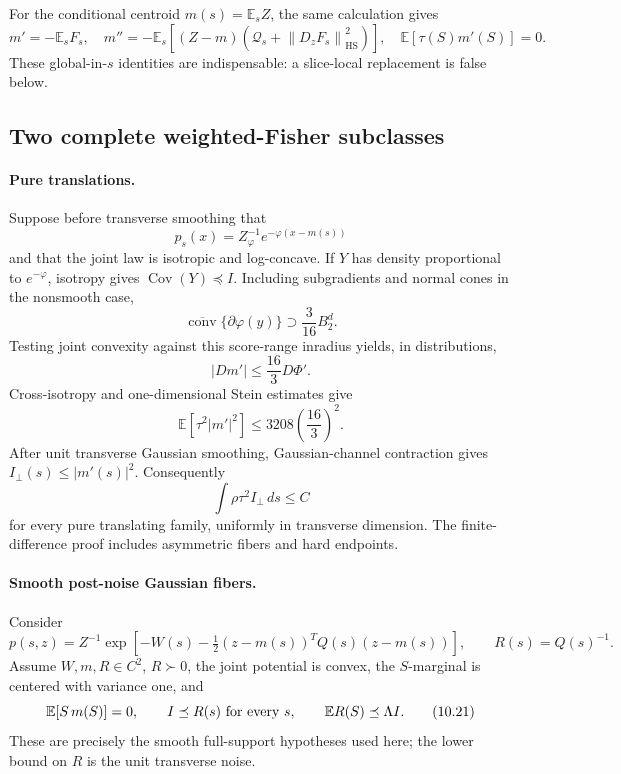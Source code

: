 \documentclass[11pt]{article}
\theoremstyle{definition}
\theoremstyle{remark}
\newcommand{\E}{\mathbb E}
\newcommand{\Cov}{\operatorname{Cov}}
\newcommand{\HS}{\mathrm{HS}}
\newcommand{\1}{\mathbf 1}
\newcommand{\norm}[1]{\left\lVert #1\right\rVert}
\begin{document}
For the conditional centroid \(m(s)=\E_sZ\), the same calculation gives
\[
 m'=-\E_sF_s,\quad
 m''=-\E_s[(Z-m)(\mathcal Q_s+\norm{D_zF_s}_{\HS}^2)],
 \quad \E[\tau(S)m'(S)]=0.                           \tag{10.16}
\]
These global-in-\(s\) identities are indispensable: a slice-local
replacement is false below.

\subsection{Two complete weighted-Fisher subclasses}

\paragraph{Pure translations.}
Suppose before transverse smoothing that
\[
 p_s(x)=Z_\varphi^{-1}e^{-\varphi(x-m(s))}
\]
and that the joint law is isotropic and log-concave.  If \(Y\) has density
proportional to \(e^{-\varphi}\), isotropy gives \(\Cov(Y)\preceq I\).
Including subgradients and normal cones in the nonsmooth case,
\[
 \overline{\operatorname{conv}}\{\partial\varphi(y)\}
 \supset\frac3{16}B_2^d.                             \tag{10.17}
\]
Testing joint convexity against this score-range inradius yields,
in distributions,
\[
                         |Dm'|\le\frac{16}{3}D\Phi'. \tag{10.18}
\]
Cross-isotropy and one-dimensional Stein estimates give
\[
 \E[\tau^2|m'|^2]
 \le3208\left(\frac{16}{3}\right)^2.                 \tag{10.19}
\]
After unit transverse Gaussian smoothing, Gaussian-channel contraction
gives \(I_\perp(s)\le|m'(s)|^2\).  Consequently
\[
                         \int\rho\tau^2I_\perp\,ds\le C \tag{10.20}
\]
for every pure translating family, uniformly in transverse dimension.
The finite-difference proof includes asymmetric fibers and hard endpoints.

\paragraph{Smooth post-noise Gaussian fibers.}
Consider
\[
 p(s,z)=Z^{-1}\exp\left[
 -W(s)-\tfrac12(z-m(s))^TQ(s)(z-m(s))\right],
 \qquad R(s)=Q(s)^{-1}.
\]
Assume \(W,m,R\in C^2\), \(R\succ0\), the joint potential is convex, the
\(S\)-marginal is centered with variance one, and
\[
 \E[S\,m(S)]=0,\qquad
 I\preceq R(s)\ \hbox{for every \(s\)},\qquad
 \E R(S)\preceq\Lambda I.                            \tag{10.21}
\]
These are precisely the smooth full-support hypotheses used here; the
lower bound on \(R\) is the unit transverse noise.
\end{document}
